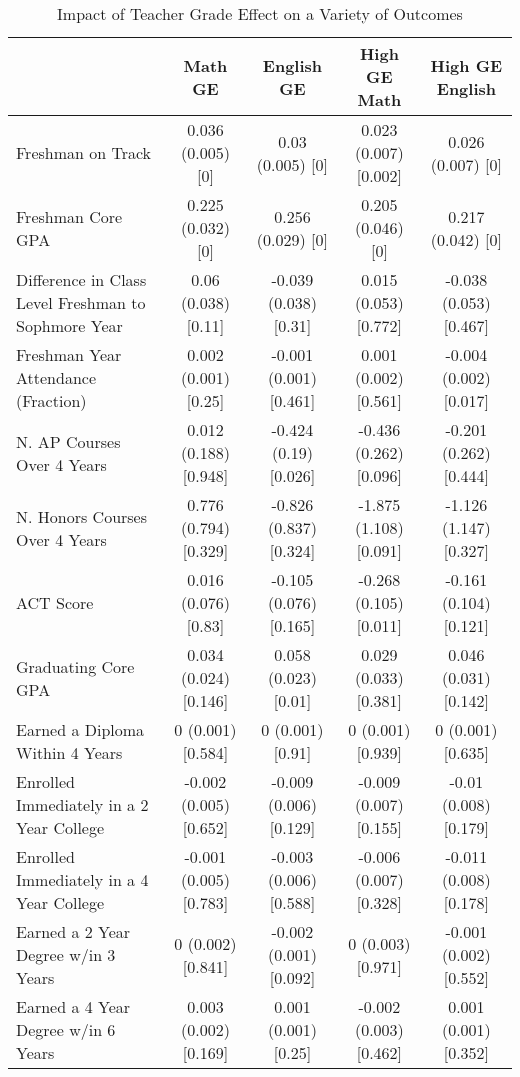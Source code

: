 \begin{table}

\caption{Impact of Teacher Grade Effect on a Variety of Outcomes\label{tbl:results}}
\centering
\begin{tabular}[t]{lcccc}
\toprule
  & Math GE & English GE & High GE Math & High GE English\\
\midrule
Freshman on Track & 0.036 (0.005) [0] & 0.03 (0.005) [0] & 0.023 (0.007) [0.002] & 0.026 (0.007) [0]\\
Freshman Core GPA & 0.225 (0.032) [0] & 0.256 (0.029) [0] & 0.205 (0.046) [0] & 0.217 (0.042) [0]\\
Difference in Class Level Freshman to Sophmore Year & 0.06 (0.038) [0.11] & -0.039 (0.038) [0.31] & 0.015 (0.053) [0.772] & -0.038 (0.053) [0.467]\\
Freshman Year Attendance (Fraction) & 0.002 (0.001) [0.25] & -0.001 (0.001) [0.461] & 0.001 (0.002) [0.561] & -0.004 (0.002) [0.017]\\
\addlinespace
N. AP Courses Over 4 Years & 0.012 (0.188) [0.948] & -0.424 (0.19) [0.026] & -0.436 (0.262) [0.096] & -0.201 (0.262) [0.444]\\
N. Honors Courses Over 4 Years & 0.776 (0.794) [0.329] & -0.826 (0.837) [0.324] & -1.875 (1.108) [0.091] & -1.126 (1.147) [0.327]\\
ACT Score & 0.016 (0.076) [0.83] & -0.105 (0.076) [0.165] & -0.268 (0.105) [0.011] & -0.161 (0.104) [0.121]\\
Graduating Core GPA & 0.034 (0.024) [0.146] & 0.058 (0.023) [0.01] & 0.029 (0.033) [0.381] & 0.046 (0.031) [0.142]\\
Earned a Diploma Within 4 Years & 0 (0.001) [0.584] & 0 (0.001) [0.91] & 0 (0.001) [0.939] & 0 (0.001) [0.635]\\
\addlinespace
Enrolled Immediately in a 2 Year College & -0.002 (0.005) [0.652] & -0.009 (0.006) [0.129] & -0.009 (0.007) [0.155] & -0.01 (0.008) [0.179]\\
Enrolled Immediately in a 4 Year College & -0.001 (0.005) [0.783] & -0.003 (0.006) [0.588] & -0.006 (0.007) [0.328] & -0.011 (0.008) [0.178]\\
Earned a 2 Year Degree w/in 3 Years & 0 (0.002) [0.841] & -0.002 (0.001) [0.092] & 0 (0.003) [0.971] & -0.001 (0.002) [0.552]\\
Earned a 4 Year Degree w/in 6 Years & 0.003 (0.002) [0.169] & 0.001 (0.001) [0.25] & -0.002 (0.003) [0.462] & 0.001 (0.001) [0.352]\\
\bottomrule
\end{tabular}
\end{table}
